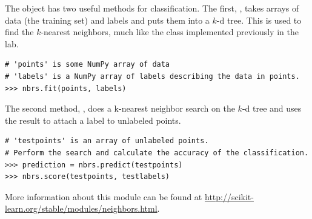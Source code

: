 The  object has two useful methods for classification.
The first, , takes arrays of data (the training set) and labels and puts them into a $k$-d tree.
This is used to find the $k$-nearest neighbors, much like the  class implemented previously in the lab.

\begin{lstlisting}
# 'points' is some NumPy array of data
# 'labels' is a NumPy array of labels describing the data in points.
>>> nbrs.fit(points, labels)
\end{lstlisting}

The second method, , does a k-nearest neighbor search on the $k$-d tree and uses the result to attach a label to unlabeled points.

\begin{lstlisting}
# 'testpoints' is an array of unlabeled points.
# Perform the search and calculate the accuracy of the classification.
>>> prediction = nbrs.predict(testpoints)
>>> nbrs.score(testpoints, testlabels)
\end{lstlisting}

More information about this module can be found at \url{http://scikit-learn.org/stable/modules/neighbors.html}.

